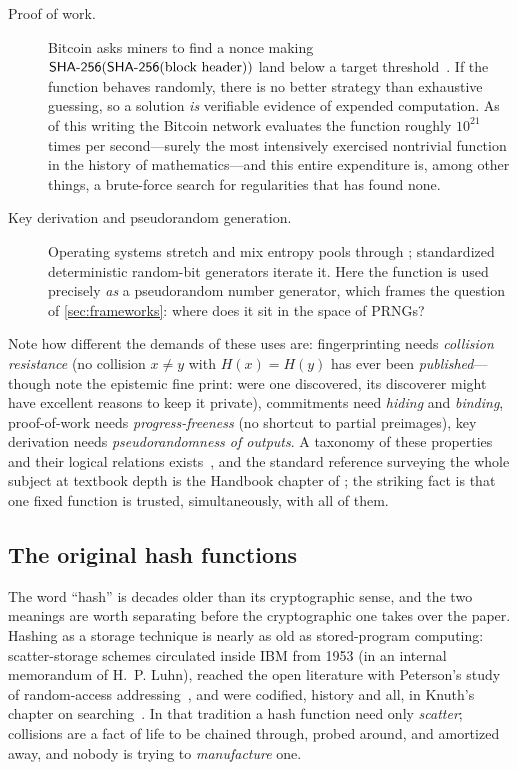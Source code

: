 \begin{description}
  \item[Proof of work.] Bitcoin asks miners to find a nonce making
  $\textsf{SHA-256}(\textsf{SHA-256}(\text{block header}))$ land below a target
  threshold~\citep{Nakamoto2008}. If the function behaves randomly, there
  is no better strategy than exhaustive guessing, so a solution \emph{is}
  verifiable evidence of expended computation. As of this writing the
  Bitcoin network evaluates the function roughly $10^{21}$ times per
  second---surely the most intensively exercised nontrivial function in
  the history of mathematics---and this entire expenditure is, among other
  things, a brute-force search for regularities that has found none.

  \item[Key derivation and pseudorandom generation.] Operating systems
  stretch and mix entropy pools through \SHA{}; standardized deterministic
  random-bit generators iterate it. Here the function is used precisely
  \emph{as} a pseudorandom number generator, which frames the question of
  \cref{sec:frameworks}: where does it sit in the space of PRNGs?
\end{description}

Note how different the demands of these uses are: fingerprinting needs
\emph{collision resistance} (no collision $x \ne y$ with $H(x) = H(y)$
has ever been \emph{published}---though note the epistemic fine print:
were one discovered, its discoverer might have excellent reasons to keep
it private),
commitments need \emph{hiding} and \emph{binding}, proof-of-work needs
\emph{progress-freeness} (no shortcut to partial preimages), key
derivation needs \emph{pseudorandomness of outputs}. A taxonomy of these
properties and their logical relations exists~\citep{RogawayShrimpton2004},
and the standard reference surveying the whole subject at textbook depth
is the Handbook chapter of \citet[Ch.~9]{MenezesOorschotVanstone1996};
the striking fact is that one fixed function is trusted, simultaneously,
with all of them.

\subsection{The original hash functions}\label{sec:elderhash}

The word ``hash'' is decades older than its cryptographic sense, and the
two meanings are worth separating before the cryptographic one takes over
the paper. Hashing as a storage technique is nearly as old as
stored-program computing: scatter-storage schemes circulated inside IBM
from 1953 (in an internal memorandum of H.~P. Luhn), reached the open
literature with Peterson's study of random-access
addressing~\citep{Peterson1957}, and were codified, history and all, in
Knuth's chapter on searching~\citep[\S 6.4]{Knuth1998}. In that tradition
a hash function need only \emph{scatter}; collisions are a fact of life
to be chained through, probed around, and amortized away, and nobody is
trying to \emph{manufacture} one.


